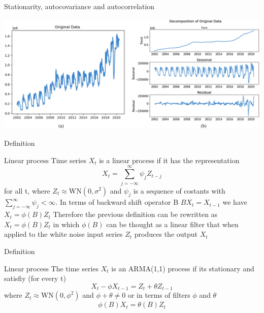 \documentclass[11pt]{beamer}
\begin{document}
\begin{frame}{Stationarity, autocovariance and autocorrelation \cite{hao2024improving}}
    \begin{center}
     \includegraphics[width=\textwidth]{Pic/Destagionalizzazione.png}
    \end{center}
\end{frame}

\begin{frame}{Definition \cite{brockwell2002introduction}}
\begin{alertblock}{Linear process}
Time series ${X}_{t}$ is a linear process if it has the representation
\begin{equation*}
X_{t}=\sum_{j=-\infty}^{\infty}\psi_{j}Z_{t-j}
\end{equation*}
for all t, where ${Z_{t}}\approx \textrm{WN}(0,\sigma^{2})$ and ${\psi_{j}}$ is a sequence of costants with $\sum_{j=-\infty}^{\infty}\psi_{j} < \infty $. In terms of backward shift operator B $BX_{t}=X_{t-1}$ we have $X_{t}=\phi(B)Z_{t}$ Therefore the previous definition can be rewritten as $X_{t}=\phi(B)Z_{t}$ in which $\phi(B)$ can be thought as a linear filter that when applied to the white noise input series ${Z_{t}}$ produces the output ${X_{t}}$
\end{alertblock}
\end{frame}


\begin{frame}{Definition \cite{brockwell2002introduction}}
\begin{alertblock}{Linear process}
The time series ${X_{t}}$ is an ARMA(1,1) process if its stationary and satisfiy (for every t) 
\begin{equation*}
X_{t}-\phi X_{t-1}=Z_{t}+\theta Z_{t-1}
\end{equation*}
where $Z_{t} \approx \textrm{WN}(0,\phi^{2})$ and $\phi+\theta \neq 0 $
or in terms of filters $\phi$ and $\theta$
\begin{equation*}
\phi(B)X_{t}=\theta(B)Z_{t}
\end{equation*}
\end{alertblock}
\end{frame}
\end{document}
